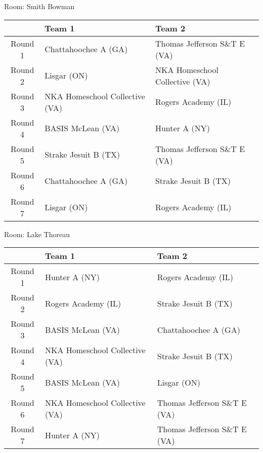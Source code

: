 \documentclass{article}%
\begin{document}
\vspace*{8pt}%
\linebreak%
\begin{flushleft}%
\begin{Large}%
Room: Smith Bowman%
\end{Large}%
\end{flushleft}%
\begin{tabularx}{\textwidth}{|c|Y|Y|}%
\hline%
&Team 1&Team 2\\%
\hline%
Round 1&Chattahoochee A (GA)&Thomas Jefferson S\&T E (VA)\\%
Round 2&Lisgar (ON)&NKA Homeschool Collective (VA)\\%
Round 3&NKA Homeschool Collective (VA)&Rogers Academy (IL)\\%
Round 4&BASIS McLean (VA)&Hunter A (NY)\\%
Round 5&Strake Jesuit B (TX)&Thomas Jefferson S\&T E (VA)\\%
Round 6&Chattahoochee A (GA)&Strake Jesuit B (TX)\\%
Round 7&Lisgar (ON)&Rogers Academy (IL)\\%
\hline%
\end{tabularx}%
\vspace*{8pt}%
\linebreak%
\begin{flushleft}%
\begin{Large}%
Room: Lake Thoreau%
\end{Large}%
\end{flushleft}%
\begin{tabularx}{\textwidth}{|c|Y|Y|}%
\hline%
&Team 1&Team 2\\%
\hline%
Round 1&Hunter A (NY)&Rogers Academy (IL)\\%
Round 2&Rogers Academy (IL)&Strake Jesuit B (TX)\\%
Round 3&BASIS McLean (VA)&Chattahoochee A (GA)\\%
Round 4&NKA Homeschool Collective (VA)&Strake Jesuit B (TX)\\%
Round 5&BASIS McLean (VA)&Lisgar (ON)\\%
Round 6&NKA Homeschool Collective (VA)&Thomas Jefferson S\&T E (VA)\\%
Round 7&Hunter A (NY)&Thomas Jefferson S\&T E (VA)\\%
\hline%
\end{tabularx}%
\vspace*{8pt}%
\linebreak%
\newline%
\end{document}
